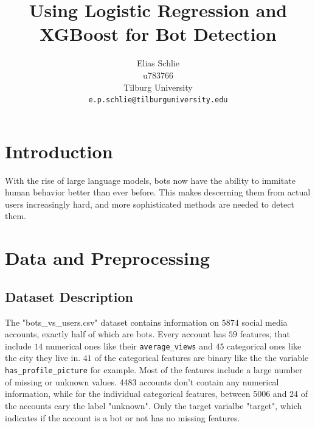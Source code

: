 \documentclass[twocolumn]{article}
\title{Using Logistic Regression and XGBoost for Bot Detection}
\author{
 Elias Schlie \\
 u783766 \\
 Tilburg University \\
  \texttt{e.p.schlie@tilburguniversity.edu}
}
\date{}
\begin{document}

\section{Introduction}

With the rise of large language models, bots now have the ability to immitate human behavior better than ever before. This makes descerning them from actual users increasingly hard, and more sophisticated methods are needed to detect them.


\section{Data and Preprocessing}

\subsection{Dataset Description}

The 
"bots\_vs\_users.csv" dataset contains information on $5874$ social media accounts, exactly half of which are bots. Every account has $59$ features, that include $14$ numerical ones like their \texttt{average\_views} and $45$ categorical ones like the city they live in. $41$ of the categorical features are binary like the the variable \texttt{has\_profile\_picture} for example.
Most of the features include a large number of missing or unknown values. 4483 accounts don't contain any numerical information, while for the individual categorical features, between 5006 and 24 of the accounts cary the label "unknown".
Only the target varialbe "target", which indicates if the account is a bot or not has no missing features.
\end{document}
